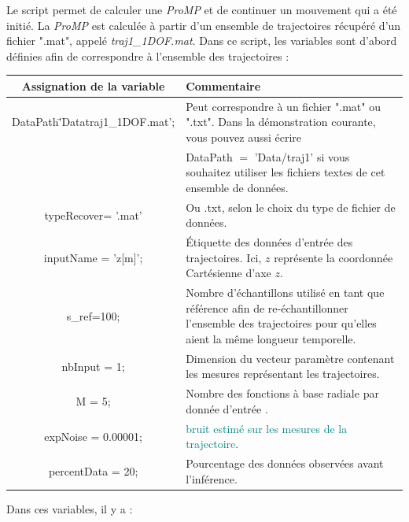 \documentclass[utf8]{frontiersSCNS} %
\newcommand{\toimprove}[1]{\textcolor{teal}{#1}}
\begin{document}
Le script  permet de calculer une \textit{ProMP} et de continuer un mouvement qui a été initié. La \textit{ProMP} est calculée à partir d'un ensemble de trajectoires récupéré d'un fichier ".mat", appelé \textit{traj1\_1DOF.mat}. Dans ce script, les variables sont d'abord définies afin de correspondre à l'ensemble des trajectoires :
\begin{tabular}{|c|l|}
  \hline
  \textbf{Assignation de la variable } & \textbf{Commentaire}\\
  \hline
  DataPath\= 'Data\/traj1\_1DOF.mat'; & Peut correspondre à un fichier ".mat" ou ".txt". Dans la démonstration courante, vous pouvez aussi écrire\\
  & DataPath $=$ 'Data/traj1' si vous souhaitez utiliser les fichiers textes de cet ensemble de données.\\
     \hline
  typeRecover= '.mat' & Ou .txt, selon le choix du type de fichier de données.\\
    \hline
  inputName = {'z[m]'}; & Étiquette des données d'entrée des trajectoires. Ici, $z$ représente la coordonnée Cartésienne d'axe $z$.\\
    \hline
  s\_ref=100; & Nombre d'échantillons utilisé en tant que référence afin de re-échantillonner l'ensemble des trajectoires pour qu'elles aient la même longueur temporelle.\\
    \hline
  nbInput = 1; & Dimension du vecteur paramètre contenant les mesures représentant les trajectoires.\\
    \hline
  M = 5;  & Nombre des fonctions à base radiale par donnée d'entrée 
  .\\
    \hline
  expNoise = 0.00001;  & \toimprove{bruit estimé sur les mesures de la trajectoire}.\\
    \hline
  percentData = 20;  & Pourcentage des données observées avant l'inférence.\\
  \hline
  \end{tabular}

Dans ces variables, il y a :
\end{document}
